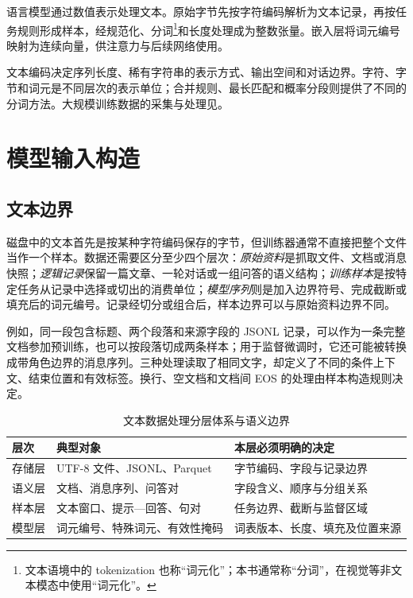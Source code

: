\documentclass[../textbook.tex]{subfiles}
\begin{document}
\fi
{}

语言模型通过数值表示处理文本。原始字节先按字符编码解析为文本记录，再按任务规则形成样本，经规范化、分词\footnote{文本语境中的 tokenization 也称“词元化”；本书通常称“分词”，在视觉等非文本模态中使用“词元化”。}和长度处理成为整数张量。嵌入层将词元编号映射为连续向量，供注意力与后续网络使用。

文本编码决定序列长度、稀有字符串的表示方式、输出空间和对话边界。字符、字节和词元是不同层次的表示单位；合并规则、最长匹配和概率分段则提供了不同的分词方法。大规模训练数据的采集与处理见。

\section{模型输入构造}

\subsection{文本边界}
磁盘中的文本首先是按某种字符编码保存的字节，但训练器通常不直接把整个文件当作一个样本。数据还需要区分至少四个层次：\emph{原始资料}是抓取文件、文档或消息快照；\emph{逻辑记录}保留一篇文章、一轮对话或一组问答的语义结构；\emph{训练样本}是按特定任务从记录中选择或切出的消费单位；\emph{模型序列}则是加入边界符号、完成截断或填充后的词元编号。记录经切分或组合后，样本边界可以与原始资料边界不同。

例如，同一段包含标题、两个段落和来源字段的 JSONL 记录，可以作为一条完整文档参加预训练，也可以按段落切成两条样本；用于监督微调时，它还可能被转换成带角色边界的消息序列。三种处理读取了相同文字，却定义了不同的条件上下文、结束位置和有效标签。换行、空文档和文档间 EOS 的处理由样本构造规则决定。

\begin{table}[htbp]
\centering
\caption{文本数据处理分层体系与语义边界}\label{tab:data-hierarchy}
\begin{tabularx}{\linewidth}{p{18mm}p{42mm}X}
\toprule 层次 & 典型对象 & 本层必须明确的决定\\\midrule
存储层 & UTF-8 文件、JSONL、Parquet & 字节编码、字段与记录边界\\
语义层 & 文档、消息序列、问答对 & 字段含义、顺序与分组关系\\
样本层 & 文本窗口、提示—回答、句对 & 任务边界、截断与监督区域\\
模型层 & 词元编号、特殊词元、有效性掩码 & 词表版本、长度、填充及位置来源\\
\bottomrule
\end{tabularx}
\end{table}
\end{document}
